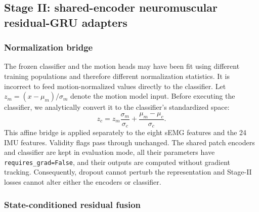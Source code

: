 \subsection{Stage II: shared-encoder neuromuscular residual-GRU adapters}
\label{subsec:residual-gru}

\subsubsection{Normalization bridge}

The frozen classifier and the motion heads may have been fit using different
training populations and therefore different normalization statistics.  It is
incorrect to feed motion-normalized values directly to the classifier.  Let
$z_m=(x-\mu_m)/\sigma_m$ denote the motion model input.  Before executing the
classifier, we analytically convert it to the classifier's standardized space:
\begin{equation}
 z_c = z_m\frac{\sigma_m}{\sigma_c}
       +\frac{\mu_m-\mu_c}{\sigma_c}.
\end{equation}
This affine bridge is applied separately to the eight sEMG features and the 24
IMU features.  Validity flags pass through unchanged.  The shared patch
encoders and classifier are kept in evaluation mode, all their parameters have
\texttt{requires\_grad=False}, and their outputs are computed without gradient
tracking.  Consequently, dropout cannot perturb the representation and
Stage-II losses cannot alter either the encoders or classifier.

\subsubsection{State-conditioned residual fusion}

